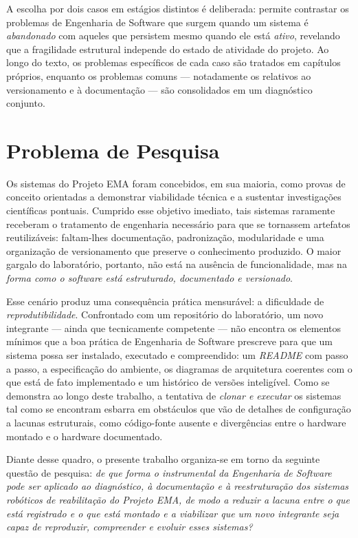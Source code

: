 A escolha por dois casos em estágios distintos é deliberada: permite contrastar os
problemas de Engenharia de Software que surgem quando um sistema é \emph{abandonado} com
aqueles que persistem mesmo quando ele está \emph{ativo}, revelando que a fragilidade
estrutural independe do estado de atividade do projeto. Ao longo do texto, os problemas
específicos de cada caso são tratados em capítulos próprios, enquanto os problemas comuns
--- notadamente os relativos ao versionamento e à documentação --- são consolidados em um
diagnóstico conjunto.

\section{Problema de Pesquisa}
\label{sec:problema}

Os sistemas do Projeto EMA foram concebidos, em sua maioria, como provas de conceito
orientadas a demonstrar viabilidade técnica e a sustentar investigações científicas
pontuais. Cumprido esse objetivo imediato, tais sistemas raramente receberam o tratamento
de engenharia necessário para que se tornassem artefatos reutilizáveis: faltam-lhes
documentação, padronização, modularidade e uma organização de versionamento que preserve o
conhecimento produzido. O maior gargalo do laboratório, portanto, não está na ausência de
funcionalidade, mas na \emph{forma como o software está estruturado, documentado e
versionado}.

Esse cenário produz uma consequência prática mensurável: a dificuldade de
\emph{reprodutibilidade}. Confrontado com um repositório do laboratório, um novo integrante
--- ainda que tecnicamente competente --- não encontra os elementos mínimos que a boa
prática de Engenharia de Software prescreve para que um sistema possa ser instalado,
executado e compreendido: um \emph{README} com passo a passo, a especificação do ambiente,
os diagramas de arquitetura coerentes com o que está de fato implementado e um histórico de
versões inteligível. Como se demonstra ao longo deste trabalho, a tentativa de
\emph{clonar e executar} os sistemas tal como se encontram esbarra em obstáculos que vão de
detalhes de configuração a lacunas estruturais, como código-fonte ausente e divergências
entre o hardware montado e o hardware documentado.

Diante desse quadro, o presente trabalho organiza-se em torno da seguinte questão de
pesquisa: \emph{de que forma o instrumental da Engenharia de Software pode ser aplicado ao
diagnóstico, à documentação e à reestruturação dos sistemas robóticos de reabilitação do
Projeto EMA, de modo a reduzir a lacuna entre o que está registrado e o que está montado e
a viabilizar que um novo integrante seja capaz de reproduzir, compreender e evoluir esses
sistemas?}

